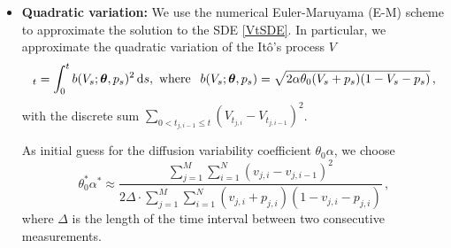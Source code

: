 \documentclass[11pt]{article}
\theoremstyle{definition}
\begin{document}
\begin{itemize}
\item \textbf{Quadratic variation:} We use the numerical Euler-Maruyama (E-M) scheme to approximate the solution to the SDE  \eqref{VtSDE}. In particular, we approximate the quadratic variation of the  It\^{o}'s  process $V$
\begin{equation*}
[V]_t=\int_0^t b(V_s; \bm{\theta}, p_s)^2 \dif s, \text{ where }  \:\: b(V_s; \bm{\theta}, p_s) = 
\sqrt{2 \alpha \theta_0 (V_s +p_s ) (1-V_s - p_s)}\,,
\end{equation*}
with the discrete sum $\sum_{0< t_{j, i-1} \leq t}(V_{t_{j, i}} - V_{t_{j, i-1}})^2$.

As initial guess for the diffusion variability coefficient $\theta_0 \alpha$, we choose
\begin{equation}
\theta_0^*\alpha^*\approx\frac{\sum_{j=1}^M\sum_{i=1}^N(v_{j,i} - v_{j,i-1})^2}{2\Delta\cdot\sum_{j=1}^M\sum_{i=1}^N(v_{j,i}+p_{j,i})(1-v_{j,i}-p_{j,i})}\,,
\label{Eq-2}
\end{equation}
where $\Delta$ is the length of the time interval between two consecutive measurements.
\end{itemize}

%
\end{document}
